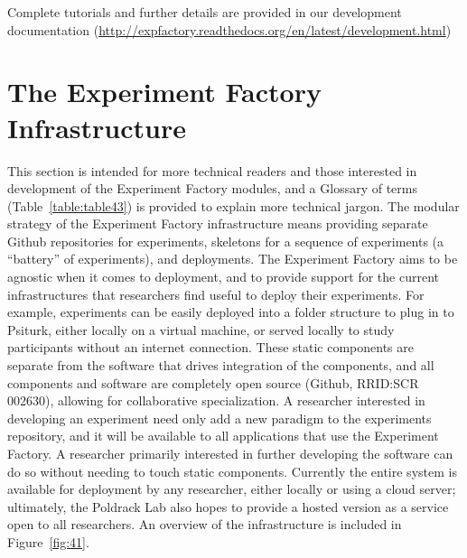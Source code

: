 \documentclass{report}
\begin{document}
Complete tutorials and further details are provided in our development
documentation \newline
(\href{http://expfactory.readthedocs.org/en/latest/development.html}{http://expfactory.readthedocs.org/en/latest/development.html})

\section{The Experiment Factory Infrastructure}

This section is intended for more technical readers and those interested
in development of the Experiment Factory modules, and a Glossary of
terms (Table~\ref{table:table43}) is provided to explain more technical jargon. The
modular strategy of the Experiment Factory infrastructure means
providing separate Github repositories for experiments, skeletons for a
sequence of experiments (a ``battery'' of experiments), and deployments.
The Experiment Factory aims to be agnostic when it comes to deployment,
and to provide support for the current infrastructures that researchers
find useful to deploy their experiments. For example, experiments can be
easily deployed into a folder structure to plug in to Psiturk, either
locally on a virtual machine, or served locally to study participants
without an internet connection. These static components are separate
from the software that drives integration of the components, and all
components and software are completely open source (Github, RRID:SCR
002630), allowing for collaborative specialization. A researcher
interested in developing an experiment need only add a new paradigm to
the experiments repository, and it will be available to all applications
that use the Experiment Factory. A researcher primarily interested in
further developing the software can do so without needing to touch
static components. Currently the entire system is available for
deployment by any researcher, either locally or using a cloud server;
ultimately, the Poldrack Lab also hopes to provide a hosted version as a
service open to all researchers. An overview of the infrastructure is
included in Figure~\ref{fig:41}.
\end{document}
